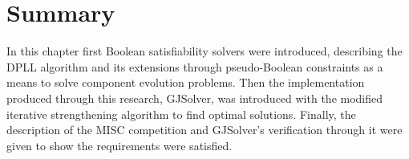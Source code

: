 

\section{Summary}
In this chapter first Boolean satisfiability solvers were introduced, 
describing the DPLL algorithm and its extensions through pseudo-Boolean constraints as a means to solve component evolution problems.
Then the implementation produced through this research, GJSolver, was introduced with the modified iterative strengthening algorithm to find optimal solutions.
Finally, the description of the MISC competition and GJSolver's verification through it were given to show the requirements were satisfied.
